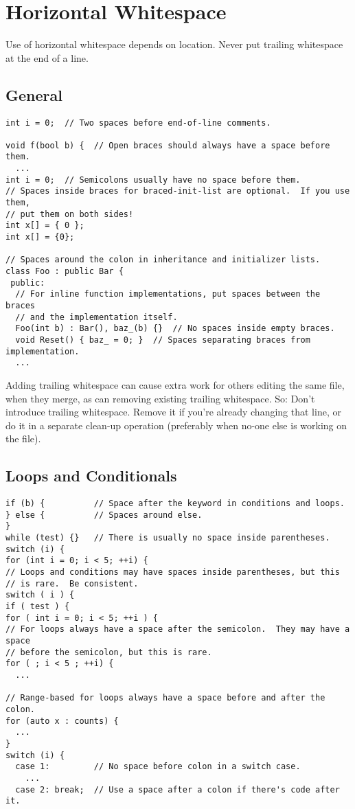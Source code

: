 
\section{Horizontal Whitespace}\label{sec:horizontal-whitespace}
Use of horizontal whitespace depends on location. Never put trailing whitespace at the end of a line.

    \subsection{General}
    \begin{verbatim}
int i = 0;  // Two spaces before end-of-line comments.

void f(bool b) {  // Open braces should always have a space before them.
  ...
int i = 0;  // Semicolons usually have no space before them.
// Spaces inside braces for braced-init-list are optional.  If you use them,
// put them on both sides!
int x[] = { 0 };
int x[] = {0};

// Spaces around the colon in inheritance and initializer lists.
class Foo : public Bar {
 public:
  // For inline function implementations, put spaces between the braces
  // and the implementation itself.
  Foo(int b) : Bar(), baz_(b) {}  // No spaces inside empty braces.
  void Reset() { baz_ = 0; }  // Spaces separating braces from implementation.
  ...
    \end{verbatim}
    Adding trailing whitespace can cause extra work for others editing the same file, when they merge, as can removing existing trailing whitespace. So: Don't introduce trailing whitespace. Remove it if you're already changing that line, or do it in a separate clean-up operation (preferably when no-one else is working on the file).
    \subsection{Loops and Conditionals}
    \begin{verbatim}
if (b) {          // Space after the keyword in conditions and loops.
} else {          // Spaces around else.
}
while (test) {}   // There is usually no space inside parentheses.
switch (i) {
for (int i = 0; i < 5; ++i) {
// Loops and conditions may have spaces inside parentheses, but this
// is rare.  Be consistent.
switch ( i ) {
if ( test ) {
for ( int i = 0; i < 5; ++i ) {
// For loops always have a space after the semicolon.  They may have a space
// before the semicolon, but this is rare.
for ( ; i < 5 ; ++i) {
  ...

// Range-based for loops always have a space before and after the colon.
for (auto x : counts) {
  ...
}
switch (i) {
  case 1:         // No space before colon in a switch case.
    ...
  case 2: break;  // Use a space after a colon if there's code after it.
    \end{verbatim}

